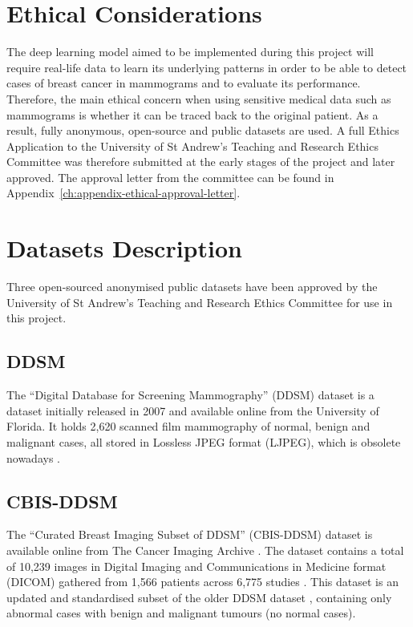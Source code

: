 \section{Ethical Considerations}

The deep learning model aimed to be implemented during this project will require real-life data to learn its underlying patterns in order to be able to detect cases of breast cancer in mammograms and to evaluate its performance. Therefore, the main ethical concern when using sensitive medical data such as  mammograms is whether it can be traced back to the original patient. As a result, fully anonymous, open-source and public datasets are used. A full Ethics Application to the University of St Andrew's Teaching and Research Ethics Committee was therefore submitted at the early stages of the project and later approved. The approval letter from the committee can be found in Appendix~\ref{ch:appendix-ethical-approval-letter}.


\section{Datasets Description}

Three open-sourced anonymised public datasets have been approved by the University of St Andrew's Teaching and Research Ethics Committee for use in this project.

\subsection{DDSM}

The ``Digital Database for Screening Mammography'' (DDSM) dataset is a dataset initially released in 2007 and available online from the University of Florida. It holds 2,620 scanned film mammography of normal, benign and malignant cases, all stored in Lossless JPEG format (LJPEG), which is obsolete nowadays \citep{MichaelHeathKevinBowyerDanielKopans2001}.

\subsection{CBIS-DDSM}
\label{sec:ethics-datasets-cbisddsm}

The ``Curated Breast Imaging Subset of DDSM'' (CBIS-DDSM) dataset \citep{Lee2017} is available online from The Cancer Imaging Archive \citep{Clark2013}. The dataset contains a total of 10,239 images in Digital Imaging and Communications in Medicine format (DICOM) gathered from 1,566 patients across 6,775 studies \citep{Lee2017}. This dataset is an updated and standardised subset of the older DDSM dataset \citep{DDSMdataset2001}, containing only abnormal cases with benign and malignant tumours (no normal cases).

